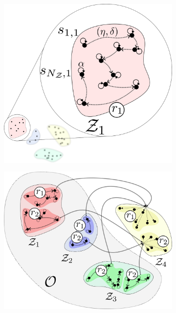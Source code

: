 \documentclass[12pt]{article}
\begin{document}
\begin{figure}[!t]
	\centering
	\hspace*{\fill}
	\begin{subfigure}[t]{0.32\textwidth}
		\subcaption{}
		\includegraphics[width= \textwidth]{intra_skill_learning.png} \label{fig:intra_skill_learning}
	\end{subfigure}
	\hfill
	\begin{subfigure}[t]{0.32\textwidth}
		\subcaption{}
		\includegraphics[width=\textwidth]{cluster_to_cluster_knowledge_transfer_parallel.png} \label{fig:cluster_to_cluster_knowledge_transfer_parallel}

\end{subfigure}
\end{figure}
\end{document}
